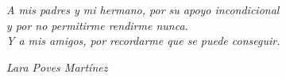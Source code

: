 \cleardoublepage


\

\ %

\

\

\ %

\

\

\

\

\

\

\

\

\

\

\

\



\begin{flushright}
    \vspace{\fill} %
    \emph{A mis padres y mi hermano, por su apoyo incondicional\\
    y por no permitirme rendirme nunca.\\[0.5cm]
    Y a mis amigos, por recordarme que se puede conseguir.}
    \par
    \vspace{0.5cm}
    \emph{Lara Poves Martínez}
\end{flushright}

\thispagestyle{empty}


